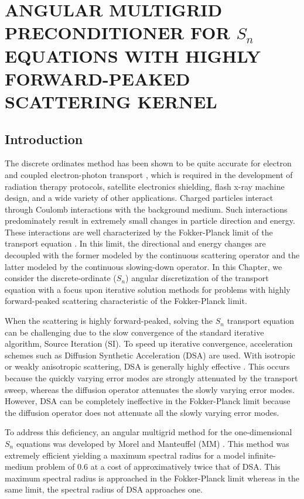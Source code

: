 \chapter{\uppercase{Angular Multigrid Preconditioner for $S_n$ equations with Highly
Forward-Peaked Scattering Kernel}} \label{anmg_chapter}
\section{Introduction}
The discrete ordinates method has been shown to be quite accurate for electron
and coupled electron-photon transport \cite{accuracy_2,morel_81,accuracy_1}, 
which is required in the development of radiation therapy protocols, satellite 
electronics shielding, flash x-ray machine design, and a wide variety of other 
applications. Charged particles interact through Coulomb interactions with the 
background medium. Such interactions predominately result in extremely small changes 
in particle direction and energy. These interactions are well characterized by the
Fokker-Planck limit of the transport equation \cite{fp_limit,morel_96}. In this 
limit, the directional and energy changes are decoupled with the former modeled 
by the continuous scattering operator and the latter modeled by the continuous 
slowing-down operator. In this Chapter, we consider the discrete-ordinate ($S_n$) 
angular discretization of the transport equation with a focus upon iterative 
solution methods for problems with highly forward-peaked scattering characteristic 
of the Fokker-Planck limit. 

When the scattering is highly forward-peaked, solving the $S_n$ transport
equation can be challenging due to the slow convergence of the standard iterative
algorithm, Source Iteration (SI). To speed up iterative convergence,
acceleration schemes such as Diffusion Synthetic Acceleration (DSA) are used.
With isotropic or weakly anisotropic scattering, DSA is generally highly
effective \cite{dsa_ref}. This occurs because the quickly varying
error modes are strongly attenuated by the transport sweep, whereas the
diffusion operator attenuates the slowly varying error modes. However, DSA can
be completely ineffective in the Fokker-Planck limit \cite{multigrid_1d} because
the diffusion operator does not attenuate all the slowly varying error modes.

To address this deficiency, an  angular multigrid method for the
one-dimensional $S_n$
equations was developed by Morel and Manteuffel (MM) \cite{multigrid_1d}. This
method was extremely efficient yielding a maximum spectral radius for 
a model infinite-medium problem of 0.6 at a cost of
approximatively twice that of DSA. This maximum spectral radius is approached
in the Fokker-Planck limit whereas in the same limit, the spectral radius of DSA
approaches one. 


